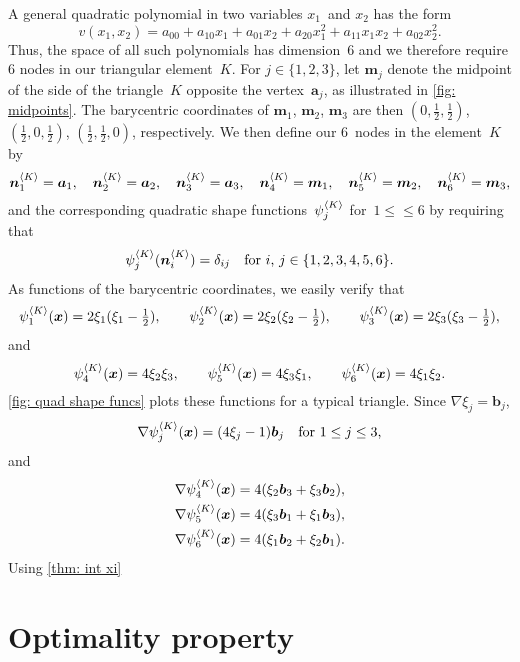 A general quadratic polynomial in two variables $x_1$~and $x_2$ has the form
\[
v(x_1,x_2)=a_{00}+a_{10}x_1+a_{01}x_2+a_{20}x_1^2+a_{11}x_1x_2+a_{02}x_2^2.
\]
Thus, the space of all such polynomials has dimension~$6$ and we therefore 
require $6$ nodes in our triangular element~$K$. For $j\in\{1,2,3\}$, let 
$\boldsymbol{m}_j$ denote the midpoint of the side of the triangle~$K$ opposite 
the vertex~$\boldsymbol{a}_j$, as illustrated in
\cref{fig: midpoints}.  The barycentric coordinates of $\boldsymbol{m}_1$, 
$\boldsymbol{m}_2$, $\boldsymbol{m}_3$ are then $(0,\tfrac12,\tfrac12)$,
$(\tfrac12,0,\tfrac12)$, $(\tfrac12,\tfrac12,0)$, respectively.  We then define 
our 6~nodes in the element~$K$ by
\[
\boldsymbol{n}^{\langle K\rangle}_1=\boldsymbol{a}_1,\quad
\boldsymbol{n}^{\langle K\rangle}_2=\boldsymbol{a}_2,\quad
\boldsymbol{n}^{\langle K\rangle}_3=\boldsymbol{a}_3,\quad
\boldsymbol{n}^{\langle K\rangle}_4=\boldsymbol{m}_1,\quad
\boldsymbol{n}^{\langle K\rangle}_5=\boldsymbol{m}_2,\quad
\boldsymbol{n}^{\langle K\rangle}_6=\boldsymbol{m}_3,
\]
and the corresponding quadratic shape functions~$\psi^{\langle K\rangle}_j$ 
for~$1\le \le 6$ by requiring that
\[
\psi^{\langle K\rangle}_j(\boldsymbol{n}^{\langle K\rangle}_i)=\delta_{ij}
\quad\text{for $i$, $j\in\{1,2,3,4,5,6\}$.}
\]
As functions of the barycentric coordinates, we easily verify that
\[
\psi^{\langle K\rangle}_1(\boldsymbol{x})=2\xi_1(\xi_1-\tfrac12),\qquad
\psi^{\langle K\rangle}_2(\boldsymbol{x})=2\xi_2(\xi_2-\tfrac12),\qquad
\psi^{\langle K\rangle}_3(\boldsymbol{x})=2\xi_3(\xi_3-\tfrac12),
\]
and
\[
\psi^{\langle K\rangle}_4(\boldsymbol{x})=4\xi_2\xi_3,\qquad
\psi^{\langle K\rangle}_5(\boldsymbol{x})=4\xi_3\xi_1,\qquad
\psi^{\langle K\rangle}_6(\boldsymbol{x})=4\xi_1\xi_2.
\]
\cref{fig: quad shape funcs} plots these functions for a typical triangle.
Since $\nabla\xi_j=\boldsymbol{b}_j$, 
\[
\nabla\psi^{\langle K\rangle}_j(\boldsymbol{x})=(4\xi_j-1)\boldsymbol{b}_j
\quad\text{for $1\le j\le 3$,}
\]
and
\begin{align*}
\nabla\psi^{\langle K\rangle}_4(\boldsymbol{x})
    &=4(\xi_2\boldsymbol{b}_3+\xi_3\boldsymbol{b}_2),\\
\nabla\psi^{\langle K\rangle}_5(\boldsymbol{x})
    &=4(\xi_3\boldsymbol{b}_1+\xi_1\boldsymbol{b}_3),\\
\nabla\psi^{\langle K\rangle}_6(\boldsymbol{x})
    &=4(\xi_1\boldsymbol{b}_2+\xi_2\boldsymbol{b}_1).
\end{align*}
Using \cref{thm: int xi}





\section{Optimality property}


